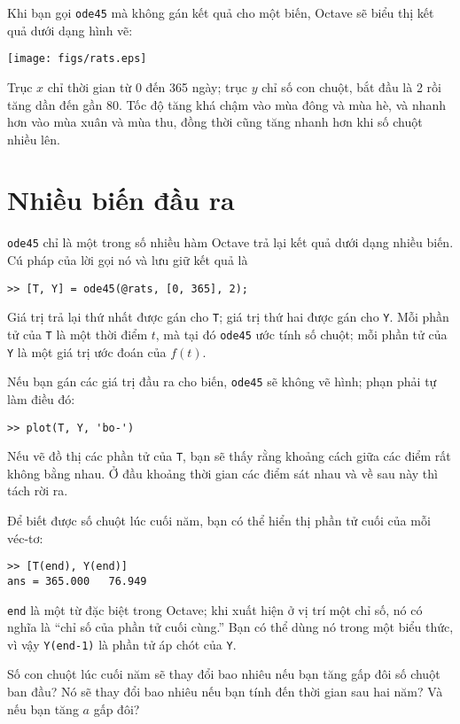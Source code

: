 \documentclass[12pt]{book}
\begin{document}
Khi bạn gọi {\tt ode45} mà không gán kết quả cho một biến,
Octave sẽ biểu thị kết quả dưới dạng hình vẽ:

\centerline{\texttt{[image: figs/rats.eps]}}

Trục $x$ chỉ thời gian từ 0 đến 365 ngày; trục $y$ chỉ số con chuột,
bắt đầu là 2 rồi tăng dần đến gần 80. Tốc độ tăng khá chậm vào 
mùa đông và mùa hè, và nhanh hơn vào mùa xuân và mùa thu,
đồng thời cũng tăng nhanh hơn khi số chuột nhiều lên.


\section{Nhiều biến đầu ra}
\label{rats}

{\tt ode45} chỉ là một trong số nhiều hàm Octave trả lại kết quả
dưới dạng nhiều biến. Cú pháp của lời gọi nó và lưu giữ kết quả là

\begin{verbatim}
>> [T, Y] = ode45(@rats, [0, 365], 2);
\end{verbatim}
%
Giá trị trả lại thứ nhất được gán cho {\tt T}; giá trị thứ hai được gán
cho {\tt Y}.  Mỗi phần tử của {\tt T} là một thời điểm $t$, mà 
tại đó {\tt ode45} ước tính số chuột; mỗi phần tử của {\tt Y} 
là một giá trị ước đoán của $f(t)$.

Nếu bạn gán các giá trị đầu ra cho biến, {\tt ode45} sẽ không 
vẽ hình; phạn phải tự làm điều đó:

\begin{verbatim}
>> plot(T, Y, 'bo-')
\end{verbatim}
%
Nếu vẽ đồ thị các phần tử của {\tt T}, bạn sẽ thấy rằng khoảng cách
giữa các điểm rất không bằng nhau. Ở đầu khoảng thời gian các điểm
sát nhau và về sau này thì tách rời ra.

Để biết được số chuột lúc cuối năm, bạn có thể hiển thị phần tử cuối
của mỗi véc-tơ:

\begin{verbatim}
>> [T(end), Y(end)]
ans = 365.000   76.949
\end{verbatim}
%
{\tt end} là một từ đặc biệt trong Octave; khi xuất hiện ở vị trí
một chỉ số, nó có nghĩa là ``chỉ số của phần tử cuối cùng.''  Bạn
có thể dùng nó trong một biểu thức, vì vậy {\tt Y(end-1)} là 
phần tử áp chót của {\tt Y}.

Số con chuột lúc cuối năm sẽ thay đổi bao nhiêu nếu bạn tăng
gấp đôi số chuột ban đầu? Nó sẽ thay đổi bao nhiêu nếu bạn 
tính đến thời gian sau hai năm? Và nếu bạn tăng $a$ gấp đôi?
\end{document}
